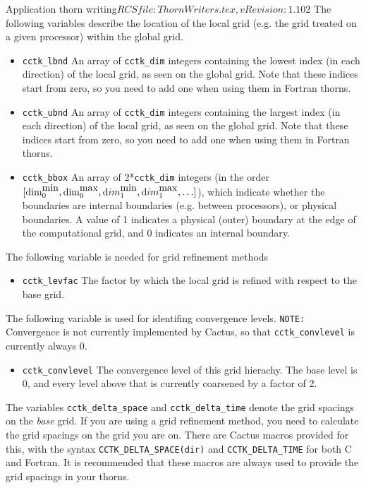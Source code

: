 \begin{cactuspart}{2}{Application thorn writing}{$RCSfile: ThornWriters.tex,v $}{$Revision: 1.102 $}
The following variables describe the location of the local
grid (e.g. the grid treated on a given processor) within
the global grid.
\begin{itemize}
\item {\tt cctk\_lbnd}
      An array of {\tt cctk\_dim} integers
      containing the lowest index (in each direction)
      of the local grid, as seen on the global grid. Note that these indices
      start from zero, so you need to add one when using them in
      Fortran thorns.
\item {\tt cctk\_ubnd}
      An array of {\tt cctk\_dim} integers
      containing the largest index (in each direction)
      of the local grid, as seen on the global grid.  Note that these indices
      start from zero, so you need to add one when using them in
      Fortran thorns.
\item {\tt cctk\_bbox}
      An array of 2*{\tt cctk\_dim} integers (in the order
	$[{\mbox{dim}}_0^{\mbox{min}}, \mbox{dim}_0^{\mbox{max}},
	{\mbox dim}_1^{\mbox{min}}, {\mbox dim}_1^{\mbox{max}}, \ldots]$),
      which indicate whether the boundaries are internal boundaries
      (e.g. between processors), or physical boundaries. A value of 1 indicates
      a physical (outer) boundary at the edge of the computational grid,
      and 0 indicates an internal boundary.
\end{itemize}

The following variable is needed for grid refinement methods
\begin{itemize}
\item {\tt cctk\_levfac} The factor by which the local grid is refined
        with respect to the base grid.
\end{itemize}

The following variable is used for identifing convergence levels. {\tt NOTE:} Convergence is not currently implemented by Cactus, so that {\tt cctk\_convlevel} is currently always 0.
\begin{itemize}
\item {\tt cctk\_convlevel} The convergence level of this grid hierachy.
 	The base level is 0, and every level above that is currently coarsened 	       by a factor of 2.
\end{itemize}

The variables {\tt cctk\_delta\_space} and {\tt cctk\_delta\_time}
denote the grid spacings on the {\em base} grid. If you are using
a grid refinement method, you need to calculate the grid spacings
on the grid you are on. There are Cactus macros provided for this,
with the syntax {\tt CCTK\_DELTA\_SPACE(dir)} and {\tt CCTK\_DELTA\_TIME}
for both C and Fortran. It is recommended that these macros are
always used to provide the grid spacings in your thorns.


\end{cactuspart}
